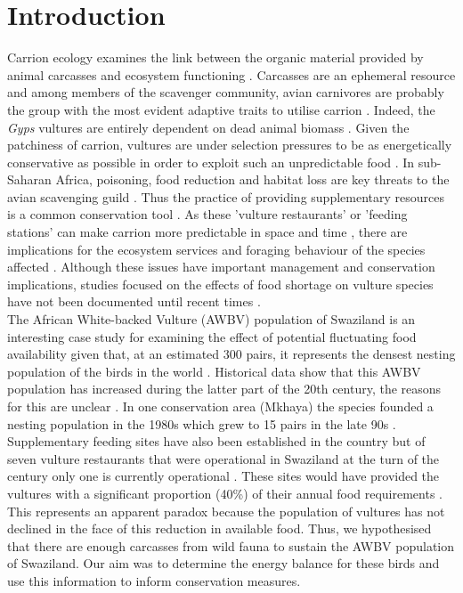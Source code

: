 \section{\uppercase{I}ntroduction}

Carrion ecology examines the link between the organic material provided by animal carcasses and ecosystem functioning \citep{barton2013role}. Carcasses are an ephemeral resource and among members of the scavenger community, avian carnivores are probably the group with the most evident adaptive traits to utilise carrion \citep{devault2003scavenging, wilson2011scavenging}. Indeed, the \textit{Gyps} vultures are entirely dependent on dead animal biomass \citep{mundy1992vultures}. Given the patchiness of carrion, vultures are under selection pressures to be as energetically conservative as possible in order to exploit such an unpredictable food \citep{ruxton2002modelling,ruxton2004obligate}.
In sub-Saharan Africa, poisoning, food reduction and habitat loss are key threats to the avian scavenging guild \citep{monadjem2003threatened}. Thus the practice of providing supplementary resources is a common conservation tool \citep{piper1999modelling,piper2005supplementary}. As these 'vulture restaurants' or 'feeding stations' can make carrion more predictable in space and time \citep{oro2008testing}, there are implications for the ecosystem services and foraging behaviour of the species affected \citep{deygout2010impact,margalida2010sanitary,monsarrat2013predictability}. Although these issues have important management and conservation implications, studies focused on the effects of food shortage on vulture species have not been documented until recent times \citep{camina2006griffon,piper2005supplementary,zuberogoitia2010reduced}. \\
\indent
The African White-backed Vulture (AWBV) population of Swaziland is an interesting case study for examining the effect of potential fluctuating food availability given that, at an estimated 300 pairs, it represents the densest nesting population of the birds in the world \citep{monadjem2005nesting}. Historical data show that this AWBV population has increased during the latter part of the 20th century, the reasons for this are unclear \citep{monadjem2003threatened}. In one conservation area (Mkhaya) the species founded a nesting population in the 1980s which grew to 15 pairs in the late 90s \citep{monadjem2003threatened}. Supplementary feeding sites have also been established in the country but of seven vulture restaurants that were operational in Swaziland at the turn of the century only one is currently operational \citep{monadjem2003nesting}. These sites would have provided the vultures with a significant proportion (40\%) of their annual food requirements \citep{monadjem2003nesting}. This represents an apparent paradox because the population of vultures has not declined in the face of this reduction in available food. Thus, we hypothesised that there are enough carcasses from wild fauna to sustain the AWBV population of Swaziland. Our aim was to determine the energy balance for these birds and use this information to inform conservation measures.
